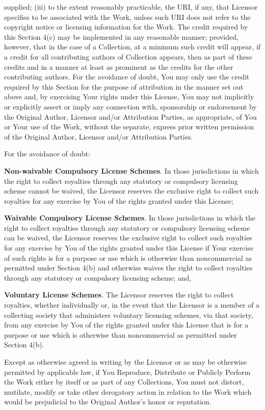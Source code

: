 \begin{doclicense@enumerate}
supplied; (iii) to the extent reasonably practicable, the
URI, if any, that Licensor specifies to be associated
with the Work, unless such URI does not refer to the
copyright notice or licensing information for the Work.
The credit required by this Section 4(c) may be
implemented in any reasonable manner; provided, however,
that in the case of a Collection, at a minimum such
credit will appear, if a credit for all contributing
authors of Collection appears, then as part of these
credits and in a manner at least as prominent as the
credits for the other contributing authors. For the
avoidance of doubt, You may only use the credit required
by this Section for the purpose of attribution in the
manner set out above and, by exercising Your rights under
this License, You may not implicitly or explicitly assert
or imply any connection with, sponsorship or endorsement
by the Original Author, Licensor and/or Attribution
Parties, as appropriate, of You or Your use of the Work,
without the separate, express prior written permission of
the Original Author, Licensor and/or Attribution
Parties.
\item 
\par For the avoidance of doubt:
\begin{doclicense@enumerate}
\item \textbf{Non-waivable Compulsory License
Schemes}. In those jurisdictions in which the
right to collect royalties through any statutory or
compulsory licensing scheme cannot be waived, the
Licensor reserves the exclusive right to collect such
royalties for any exercise by You of the rights
granted under this License;
\item \textbf{Waivable Compulsory License
Schemes}. In those jurisdictions in which the
right to collect royalties through any statutory or
compulsory licensing scheme can be waived, the
Licensor reserves the exclusive right to collect such
royalties for any exercise by You of the rights
granted under this License if Your exercise of such
rights is for a purpose or use which is otherwise
than noncommercial as permitted under Section 4(b)
and otherwise waives the right to collect royalties
through any statutory or compulsory licensing scheme;
and,
\item \textbf{Voluntary License Schemes}. The
Licensor reserves the right to collect royalties,
whether individually or, in the event that the
Licensor is a member of a collecting society that
administers voluntary licensing schemes, via that
society, from any exercise by You of the rights
granted under this License that is for a purpose or
use which is otherwise than noncommercial as
permitted under Section 4(b).
\end{doclicense@enumerate}

\item Except as otherwise agreed in writing by the Licensor
or as may be otherwise permitted by applicable law, if
You Reproduce, Distribute or Publicly Perform the Work
either by itself or as part of any Collections, You must
not distort, mutilate, modify or take other derogatory
action in relation to the Work which would be prejudicial
to the Original Author's honor or reputation.
\end{doclicense@enumerate}
